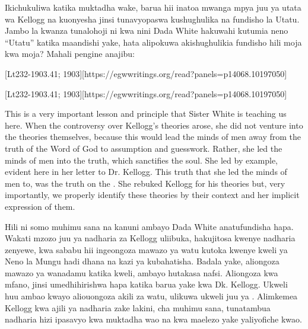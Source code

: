 Ikichukuliwa katika muktadha wake, barua hii inatoa mwanga mpya juu ya utata wa Kellogg na kuonyesha jinsi tunavyopaswa kushughulika na fundisho la Utatu. Jambo la kwanza tunalohoji ni kwa nini Dada White hakuwahi kutumia neno “Utatu” katika maandishi yake, hata alipokuwa akishughulikia fundisho hili moja kwa moja? Mahali pengine anajibu:


[Lt232-1903.41; 1903][https://egwwritings.org/read?panels=p14068.10197050]


[Lt232-1903.41; 1903][https://egwwritings.org/read?panels=p14068.10197050]


This is a very important lesson and principle that Sister White is teaching us here. When the controversy over Kellogg’s theories arose, she did not venture into the theories themselves, because this would lead the minds of men away from the truth of the Word of God to assumption and guesswork. Rather, she led the minds of men into the truth, which sanctifies the soul. She led by example, evident here in her letter to Dr. Kellogg. This truth that she led the minds of men to, was the truth on the . She rebuked Kellogg for his theories but, very importantly, we properly identify these theories by their context and her implicit expression of them.


Hili ni somo muhimu sana na kanuni ambayo Dada White anatufundisha hapa. Wakati mzozo juu ya nadharia za Kellogg uliibuka, hakujitosa kwenye nadharia zenyewe, kwa sababu hii ingeongoza mawazo ya watu kutoka kwenye kweli ya Neno la Mungu hadi dhana na kazi ya kubahatisha. Badala yake, aliongoza mawazo ya wanadamu katika kweli, ambayo hutakasa nafsi. Aliongoza kwa mfano, jinsi umedhihirishwa hapa katika barua yake kwa Dk. Kellogg. Ukweli huu ambao kwayo aliouongoza akili za watu, ulikuwa ukweli juu ya . Alimkemea Kellogg kwa ajili ya nadharia zake lakini, cha muhimu sana, tunatambua nadharia hizi ipasavyo kwa muktadha wao na kwa maelezo yake yaliyofiche kwao.


